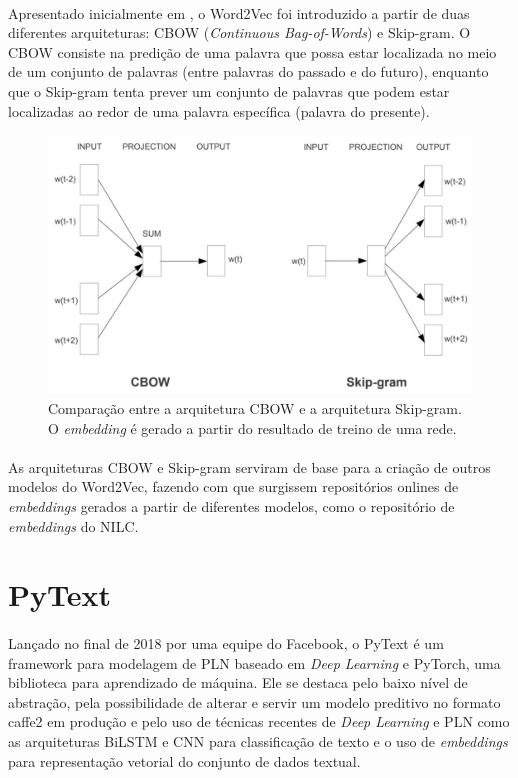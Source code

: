 \documentclass[grad,numbers]{coppe}
\begin{document}
  			\paragraph{}Apresentado inicialmente em \cite{word2vec-paper}, o Word2Vec foi introduzido a partir de duas diferentes arquiteturas: CBOW (\textit{Continuous Bag-of-Words}) e Skip-gram. O CBOW consiste na predição de uma palavra que possa estar localizada no meio de um conjunto de palavras (entre palavras do passado e do futuro), enquanto que o Skip-gram tenta prever um conjunto de palavras que podem estar localizadas ao redor de uma palavra específica (palavra do presente).
	  		\begin{figure}[h]
  				{\includegraphics[width=15cm]{word2vec-cbowskipgram.jpg}
  					\caption{Comparação entre a arquitetura CBOW e a arquitetura Skip-gram\cite{word2vec-paper}. O \textit{embedding} é gerado a partir do resultado de treino de uma rede.}
  					\label{fig:word2vec-cbowskipgram-fig}}
  			\end{figure}
	  		\paragraph{}As arquiteturas CBOW e Skip-gram serviram de base para a criação de outros modelos do Word2Vec, fazendo com que surgissem repositórios onlines de \textit{embeddings} gerados a partir de diferentes modelos, como o repositório de \textit{embeddings} do NILC\cite{nilc-repo}.
  \section{PyText}
  	\paragraph{}Lançado no final de 2018 por uma equipe do Facebook, o PyText é um framework para modelagem de PLN baseado em \textit{Deep Learning} e PyTorch, uma biblioteca para aprendizado de máquina. Ele se destaca pelo baixo nível de abstração, pela possibilidade de alterar e servir um modelo preditivo no formato caffe2 em produção e pelo uso de técnicas recentes de \textit{Deep Learning} e PLN como as arquiteturas BiLSTM e CNN para classificação de texto e o uso de \textit{embeddings} para representação vetorial do conjunto de dados textual.
\end{document}
